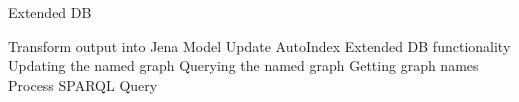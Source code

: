 \begin{frame}{Extended DB}
\begin{outline}
 \1 Transform output into Jena Model
 \1 Update AutoIndex
   \1 Extended DB functionality
     \2 Updating the named graph
     \2 Querying the named graph
     \2 Getting graph names
     \2 Process SPARQL Query
     
     
\end{outline}
\end{frame}




	